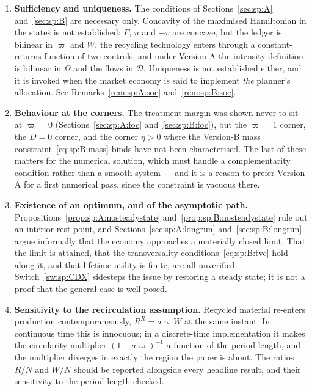 \begin{enumerate}[label=\textbf{O\arabic*.},ref=O\arabic*,leftmargin=2.6em,itemsep=0.35em]

\item\label{op:sp:soc} \textbf{Sufficiency and uniqueness.} The conditions of
Sections~\ref{sec:sp:A} and~\ref{sec:sp:B} are necessary only. Concavity of the maximised Hamiltonian
in the states is not established: $F$, $u$ and $-v$ are concave, but the ledger is bilinear in $\varpi$
and $W$, the recycling technology enters through a constant-returns function of two controls, and under
Version A the intensity definition is bilinear in $\Omega$ and the flows in $\mathcal D$. Uniqueness is
not established either, and it is invoked when the market economy is said to implement \emph{the}
planner's allocation. See Remarks~\ref{rem:sp:A:soc} and~\ref{rem:sp:B:soc}.

\item\label{op:sp:corner} \textbf{Behaviour at the corners.} The treatment margin was shown never to
sit at $\varpi=0$ (Sections~\ref{sec:sp:A:foc} and~\ref{sec:sp:B:foc}), but the $\varpi=1$ corner, the
$D=0$ corner, and the corner $\eta>0$ where the Version-B mass constraint~\eqref{eq:sp:B:mass} binds
have not been characterised. The last of these matters for the numerical solution, which must handle a
complementarity condition rather than a smooth system --- and it is a reason to prefer Version A for a
first numerical pass, since the constraint is vacuous there.

\item\label{op:sp:exist} \textbf{Existence of an optimum, and of the asymptotic path.}
Propositions~\ref{prop:sp:A:nosteadystate} and~\ref{prop:sp:B:nosteadystate} rule out an interior rest
point, and Sections~\ref{sec:sp:A:longrun} and~\ref{sec:sp:B:longrun} argue informally that the economy
approaches a materially closed limit. That the limit is attained, that the transversality
conditions~\eqref{eq:sp:B:tvc} hold along it, and that lifetime utility is finite, are all unverified.
Switch~\ref{sw:sp:CDX} sidesteps the issue by restoring a steady state; it is not a proof that the
general case is well posed.

\item\label{op:sp:period} \textbf{Sensitivity to the recirculation assumption.} Recycled material
re-enters production contemporaneously, $R^R=a\varpi W$ at the same instant. In continuous time this
is innocuous; in a discrete-time implementation it makes the circularity multiplier
$\left(1-a\varpi\right)^{-1}$ a function of the period length, and the multiplier diverges in exactly
the region the paper is about. The ratios $R/N$ and $W/N$ should be reported alongside every headline
result, and their sensitivity to the period length checked.


\end{enumerate}
